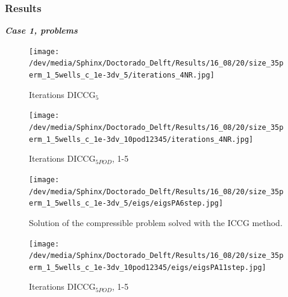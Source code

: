 \documentclass{beamer}
\begin{document}
\begin{frame}[shrink=5]
\frametitle{Results}
\emph{\Large \textbf{Case 1, problems}}\\
\begin{figure}[!h]
\centering 
\begin{minipage}{.45\textwidth}
 \centering
\texttt{[image: /dev/media/Sphinx/Doctorado\_Delft/Results/16\_08/20/size\_35perm\_1\_5wells\_c\_1e-3dv\_5/iterations\_4NR.jpg]}
\caption{Iterations DICCG$_5$}
\label{fig:compsol}
\end{minipage}%
\hspace{10mm}
\begin{minipage}{.4\textwidth}
 \centering
\texttt{[image: /dev/media/Sphinx/Doctorado\_Delft/Results/16\_08/20/size\_35perm\_1\_5wells\_c\_1e-3dv\_10pod12345/iterations\_4NR.jpg]}
\caption{Iterations DICCG$_{5POD}$, 1-5}
\label{fig:NR_POD5}
\end{minipage}
\end{figure}
\begin{figure}[!h]
\centering 
\begin{minipage}{.45\textwidth}
 \centering
\texttt{[image: /dev/media/Sphinx/Doctorado\_Delft/Results/16\_08/20/size\_35perm\_1\_5wells\_c\_1e-3dv\_5/eigs/eigsPA6step.jpg]}
\caption{Solution of the compressible problem solved with the ICCG method.}
\label{fig:compsol}
\end{minipage}%
\hspace{10mm}\begin{minipage}{.4\textwidth}
 \centering
\texttt{[image: /dev/media/Sphinx/Doctorado\_Delft/Results/16\_08/20/size\_35perm\_1\_5wells\_c\_1e-3dv\_10pod12345/eigs/eigsPA11step.jpg]}
\caption{Iterations DICCG$_{5POD}$, 1-5}
\label{fig:NR_POD5}
\end{minipage}
\end{figure}
\end{frame}
\end{document}

